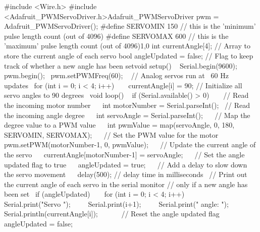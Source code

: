 #include <Wire.h>
#include <Adafruit_PWMServoDriver.h>Adafruit_PWMServoDriver pwm = Adafruit_PWMServoDriver();
#define SERVOMIN 150 // this is the 'minimum' pulse length count (out of 4096)
#define SERVOMAX 600 // this is the 'maximum' pulse length count (out of 4096)1,0
int currentAngle[4];
// Array to store the current angle of each servo
bool angleUpdated = false; 
// Flag to keep track of whether a new angle has been setvoid setup() 
{  
	Serial.begin(9600);  pwm.begin();  pwm.setPWMFreq(60);  
	// Analog servos run at ~60 Hz updates  for (int i = 0; i < 4; i++) 
	{    
		currentAngle[i] = 90; // Initialize all servo angles to 90 degrees 
	}
}
void loop() 
{  
	if (Serial.available() > 0) 
	{   
		// Read the incoming motor number    
		int motorNumber = Serial.parseInt();  
		// Read the incoming angle degree   
		int servoAngle = Serial.parseInt();    
		// Map the degree value to a PWM value   
		int pwmValue = map(servoAngle, 0, 180, SERVOMIN, SERVOMAX);    
		// Set the PWM value for the motor    
		pwm.setPWM(motorNumber-1, 0, pwmValue);    
		// Update the current angle of the servo   
		currentAngle[motorNumber-1] = servoAngle;   
		// Set the angle updated flag to true   
		angleUpdated = true;   
		// Add a delay to slow down the servo movement   
		delay(500); // delay time in milliseconds  
	}
	// Print out the current angle of each servo in the serial monitor
	// only if a new angle has been set 
	if (angleUpdated) 
	{    
		for (int i = 0; i < 4; i++) 
		{     
			Serial.print("Servo ");      
			Serial.print(i+1);      
			Serial.print(" angle: ");     
			Serial.println(currentAngle[i]);   
		}    
		// Reset the angle updated flag   
		angleUpdated = false; 
	}
}
